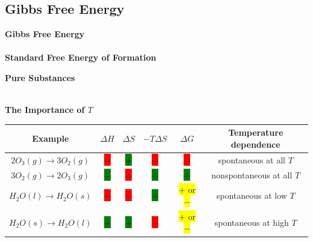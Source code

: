 \subsection{Gibbs Free Energy}
\begin{minipage}{0.71\linewidth}
\textbf{Gibbs Free Energy}\\
\\
\textbf{Standard Free Energy of Formation}\\

\end{minipage}
\begin{minipage}{0.26\linewidth}
\textbf{Pure Substances}\\
\end{minipage}\\
\textbf{The Importance of $T$}\\
\begin{tabular}{c|c|c|c|c|c}
    Example & $\Delta H$ & $\Delta S$ & $-T \Delta S$ & $\Delta G$ & Temperature dependence \\ \hline
    $2 O_3 (g) \longrightarrow 3 O_2 (g)$ & \colorbox{red}{$-$} & \colorbox{green}{$+$}  & \colorbox{red}{$-$} & \colorbox{red}{$-$} & spontaneous at all $T$\\
    $3 O_2 (g) \longrightarrow 2 O_3 (g)$ & \colorbox{green}{$+$} & \colorbox{red}{$-$} & \colorbox{green}{$+$} & \colorbox{green}{$+$}& nonspontaneous at all $T$\\
    $H_2 O (l) \longrightarrow H_2O (s)$ & \colorbox{red}{$-$} & \colorbox{red}{$-$} &\colorbox{green}{$+$}& \colorbox{yellow}{$+$ or $-$}& spontaneous at low $T$\\
    $H_2O(s) \longrightarrow H_2O(l)$ &\colorbox{green}{$+$} &\colorbox{green}{$+$} & \colorbox{red}{$-$} 
    & \colorbox{yellow}{$+$ or $-$}& spontaneous at high $T$
\end{tabular}\\
